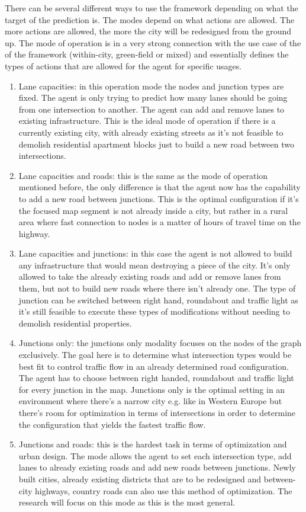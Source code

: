 \documentclass[
]{elteikthesis}[2023/04/10]
\begin{document}
There can be several different ways to use the framework depending
on what the target of the prediction is. The modes depend on what
actions are allowed. The more actions are allowed, the more the city
will be redesigned from the ground up. The mode of operation is in
a very strong connection with the use case of the of the framework
(within-city, green-field or mixed) and essentially defines the types
of actions that are allowed for the agent for specific usages. 
\begin{enumerate}
\item Lane capacities: in this operation mode the nodes and junction types
are fixed. The agent is only trying to predict how many lanes should
be going from one intersection to another. The agent can add and remove
lanes to existing infrastructure. This is the ideal mode of operation
if there is a currently existing city, with already existing streets
as it's not feasible to demolish residential apartment blocks just
to build a new road between two intersections. 
\item Lane capacities and roads: this is the same as the mode of operation
mentioned before, the only difference is that the agent now has the
capability to add a new road between junctions. This is the optimal
configuration if it's the focused map segment is not already inside
a city, but rather in a rural area where fast connection to nodes
is a matter of hours of travel time on the highway.
\item Lane capacities and junctions: in this case the agent is not allowed
to build any infrastructure that would mean destroying a piece of
the city. It's only allowed to take the already existing roads and
add or remove lanes from them, but not to build new roads where there
isn't already one. The type of junction can be switched between right
hand, roundabout and traffic light as it's still feasible to execute
these types of modifications without needing to demolish residential
properties. 
\item Junctions only: the junctions only modality focuses on the nodes of
the graph exclusively. The goal here is to determine what intersection
types would be best fit to control traffic flow in an already determined
road configuration. The agent has to choose between right handed,
roundabout and traffic light for every junction in the map. Junctions
only is the optimal setting in an environment where there's a narrow
city e.g. like in Western Europe but there's room for optimization
in terms of intersections in order to determine the configuration
that yields the fastest traffic flow.
\item Junctions and roads: this is the hardest task in terms of optimization
and urban design. The mode allows the agent to set each intersection
type, add lanes to already existing roads and add new roads between
junctions. Newly built cities, already existing districts that are
to be redesigned and between-city highways, country roads can also
use this method of optimization. The research will focus on this mode
as this is the most general. 
\end{enumerate}
\end{document}
